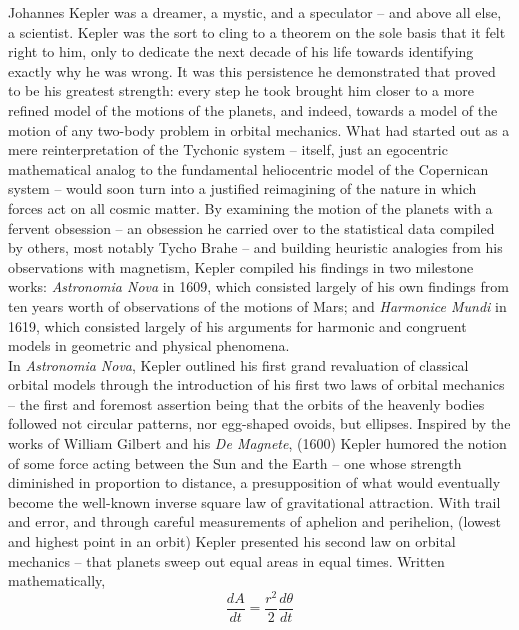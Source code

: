 \documentclass{article}
\begin{document}
Johannes Kepler was a dreamer, a mystic, and a speculator – and above all else, a scientist. Kepler was the sort to cling to a theorem on the sole basis that it felt right to him, only to dedicate the next decade of his life towards identifying exactly why he was wrong. It was this persistence he demonstrated that proved to be his greatest strength: every step he took brought him closer to a more refined model of the motions of the planets, and indeed, towards a model of the motion of any two-body problem in orbital mechanics. What had started out as a mere reinterpretation of the Tychonic system – itself, just an egocentric mathematical analog to the fundamental heliocentric model of the Copernican system – would soon turn into a justified reimagining of the nature in which forces act on all cosmic matter. By examining the motion of the planets with a fervent obsession – an obsession he carried over to the statistical data compiled by others, most notably Tycho Brahe – and building heuristic analogies from his observations with magnetism, Kepler compiled his findings in two milestone works: \textit{Astronomia Nova} in 1609, which consisted largely of his own findings from ten years worth of observations of the motions of Mars; and \textit{Harmonice Mundi} in 1619, which consisted largely of his arguments for harmonic and congruent models in geometric and physical phenomena. \\

In \textit{Astronomia Nova}, Kepler outlined his first grand revaluation of classical orbital models through the introduction of his first two laws of orbital mechanics -- the first and foremost assertion being that the orbits of the heavenly bodies followed not circular patterns, nor egg-shaped ovoids, but ellipses. Inspired by the works of William Gilbert and his \textit{De Magnete}, (1600) Kepler humored the notion of some force acting between the Sun and the Earth -- one whose strength diminished in proportion to distance, a presupposition of what would eventually become the well-known inverse square law of gravitational attraction. With trail and error, and through careful measurements of aphelion and perihelion, (lowest and highest point in an orbit) Kepler presented his second law on orbital mechanics -- that planets sweep out equal areas in equal times. Written mathematically, \\

$$ \frac{dA}{dt} = \frac{r^2}{2} \frac{d \theta}{dt} $$\\
\end{document}
